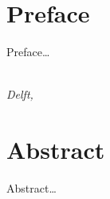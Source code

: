 \chapter*{Preface}

Preface\ldots

\begin{flushright}
{\makeatletter\itshape
    \@author \\
    Delft, \@date
    \makeatother}
\end{flushright}

\chapter*{Abstract}

Abstract\ldots





